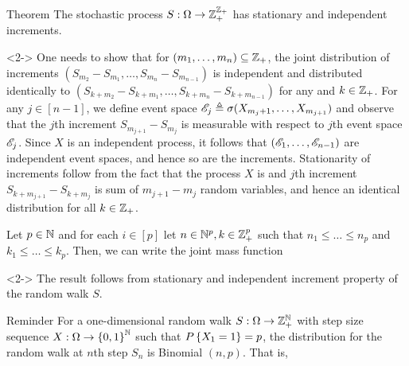 \documentclass[12pt,aspectratio=169]{beamer}
\begin{document}
\begin{frame}
\begin{block}{Theorem} 
The stochastic process $S: \Omega \to \mathbb{Z}_+^{\mathbb{Z}_+}$ has stationary and independent increments.
\end{block}
\begin{Proof}<2->
One needs to show that for $(m_1, \dots, m_n) \subseteq \mathbb{Z}_+$, 
the joint distribution of increments $(S_{m_2}-S_{m_1}, \dots, S_{m_n}-S_{m_{n-1}})$ is independent and distributed identically to $(S_{k+m_2}-S_{k+m_1}, \dots, S_{k+m_n}-S_{k+m_{n-1}})$ for any and $k \in \mathbb{Z}_+$.  
For any $j \in [n-1]$, 
we define event space $\mathscr{E}_j \triangleq \sigma(X_{m_j+1}, \dots, X_{m_{j+1}})$ and observe that the $j$th increment $S_{m_{j+1}}-S_{m_j}$ is measurable with respect to $j$th event space $\mathscr{E}_j$. 
Since $X$ is an independent process, it follows that $(\mathscr{E}_1, \dots, \mathscr{E}_{n-1})$ are independent event spaces, and hence so are the increments. 
Stationarity of increments follow from the fact that the process $X$ is \iid and $j$th increment $S_{k+m_{j+1}}-S_{k+m_j}$ is sum of $m_{j+1}-m_j$ \iid random variables, and hence an identical distribution for all $k \in \mathbb{Z}_+$. 
\end{Proof}
\end{frame}


\begin{frame}
\begin{cor} 
Let $p \in \mathbb{N}$ and for each $i \in [p]$ let $n \in \mathbb{N}^p, k \in \mathbb{Z}_+^p$ such that $n_1 \le \dots \le n_p$ and $k_1 \le \dots \le k_p$. 
Then, we can write the joint mass function 
\end{cor}
\begin{Proof}<2->
The result follows from stationary and independent increment property of the random walk $S$. %
\end{Proof}
\end{frame}

\begin{frame}
\begin{block}{Reminder} 
For a one-dimensional random walk $S: \Omega\to\mathbb{Z}_+^{\mathbb{N}}$ with \iid step size sequence $X:\Omega\to\left\{0,1\right\}^{\mathbb{N}}$ such that $P\left\{X_1 = 1\right\} = p$, 
the distribution for the random walk at $n$th step $S_n$ is Binomial $(n,p)$. 
That is, 
\end{block}
\end{frame}
\end{document}
